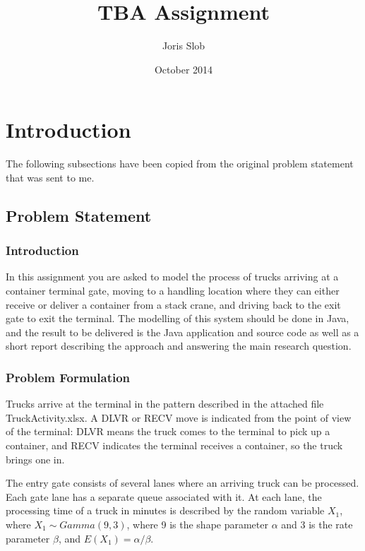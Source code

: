 \documentclass{article}
\begin{document}
\title{TBA Assignment}
\author{Joris Slob}
\date{October 2014}
\maketitle

\section{Introduction}

The following subsections have been copied from the original problem
statement that was sent to me.

\subsection{Problem Statement}

\subsubsection{Introduction}

In this assignment you are asked to model the process of trucks
arriving at a container terminal gate, moving to a handling location
where they can either receive or deliver a container from a stack
crane, and driving back to the exit gate to exit the terminal. The
modelling of this system should be done in Java, and the result to be
delivered is the Java application and source code as well as a short
report describing the approach and answering the main research
question.

\subsubsection{Problem Formulation}

Trucks arrive at the terminal in the pattern described in the attached
file TruckActivity.xlsx. A DLVR or RECV move is indicated from the
point of view of the terminal: DLVR means the truck comes to the
terminal to pick up a container, and RECV indicates the terminal
receives a container, so the truck brings one in.

The entry gate consists of several lanes where an arriving truck can
be processed. Each gate lane has a separate queue associated with
it. At each lane, the processing time of a truck in minutes is
described by the random variable $X_1$, where $X_1 \sim Gamma(9, 3)$,
where 9 is the shape parameter $\alpha$ and 3 is the rate parameter
$\beta$, and $E(X_1) = \alpha / \beta$.
\end{document}
